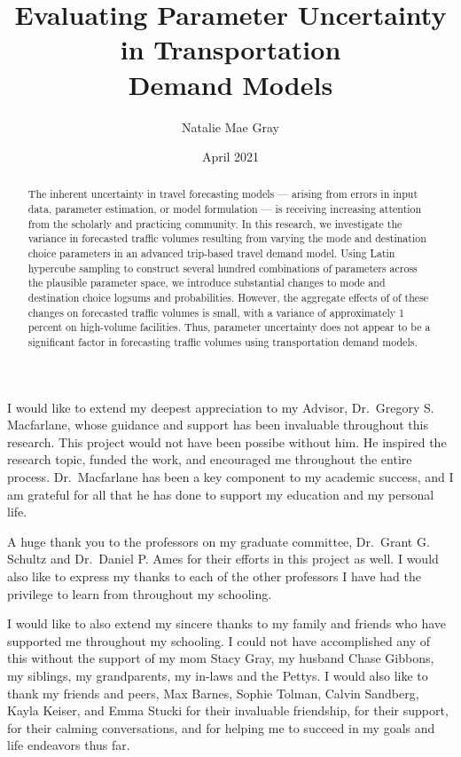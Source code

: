 \documentclass[fancy, masters, twoside]{byuthesis}
\title{Evaluating Parameter Uncertainty in Transportation\\
Demand Models}
\author{Natalie Mae Gray}
\date{April 2021}
\begin{document}
	\frontmatter

	\titlepage
	\cleardoublepage

	\customtitlepage
	\cleardoublepage


    \begin{abstract}
  The inherent uncertainty in travel forecasting models --- arising from errors in input data, parameter estimation, or model formulation --- is receiving increasing attention from the scholarly and practicing community. In this research, we investigate the variance in forecasted traffic volumes resulting from varying the mode and destination choice parameters in an advanced trip-based travel demand model. Using Latin hypercube sampling to construct several hundred combinations of parameters across the plausible parameter space, we introduce substantial changes to mode and destination choice logsums and probabilities. However, the aggregate effects of of these changes on forecasted traffic volumes is small, with a variance of approximately 1 percent on high-volume facilities. Thus, parameter uncertainty does not appear to be a significant factor in forecasting traffic volumes using transportation demand models.
  \end{abstract}
  	\cleardoublepage


    \begin{acknowledgments}
  I would like to extend my deepest appreciation to my Advisor, Dr.~Gregory S. Macfarlane, whose guidance and support has been invaluable throughout this research. This project would not have been possibe without him. He inspired the research topic, funded the work, and encouraged me throughout the entire process. Dr.~Macfarlane has been a key component to my academic success, and I am grateful for all that he has done to support my education and my personal life.

  A huge thank you to the professors on my graduate committee, Dr.~Grant G. Schultz and Dr.~Daniel P. Ames for their efforts in this project as well. I would also like to express my thanks to each of the other professors I have had the privilege to learn from throughout my schooling.

  I would like to also extend my sincere thanks to my family and friends who have supported me throughout my schooling. I could not have accomplished any of this without the support of my mom Stacy Gray, my husband Chase Gibbons, my siblings, my grandparents, my in-laws and the Pettys. I would also like to thank my friends and peers, Max Barnes, Sophie Tolman, Calvin Sandberg, Kayla Keiser, and Emma Stucki for their invaluable friendship, for their support, for their calming conversations, and for helping me to succeed in my goals and life endeavors thus far.
  \end{acknowledgments}
  	\cleardoublepage
\end{document}
